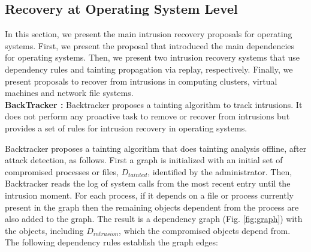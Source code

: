 %
%
\subsection{Recovery at Operating System Level}
\label{sec:recovery_os}

In this section, we present the main intrusion recovery proposals for operating systems. First, we present the proposal that introduced the main dependencies for operating systems. Then, we present two intrusion recovery systems that use dependency rules and tainting propagation via replay, respectively. Finally, we present proposals to recover from intrusions in computing clusters, virtual machines and network file systems.\\

\textbf{BackTracker \cite{backtracker}:} Backtracker proposes a tainting algorithm to track intrusions. It does not perform any proactive task to remove or recover from intrusions but provides a set of rules for intrusion recovery in operating systems.

Backtracker proposes a tainting algorithm that does tainting analysis offline, after attack detection, as follows. First a graph is initialized with an initial set of compromised processes or files, $D_{tainted}$, identified by the administrator. Then, Backtracker reads the log of system calls from the most recent entry until the intrusion moment. For each process, if it depends on a file or process currently present in the graph then the remaining objects dependent from the process are also added to the graph. The result is a dependency graph (Fig. \ref{fig:graph}) with the objects, including $D_{intrusion}$, which the compromised objects depend from. The following dependency rules establish the graph edges:

